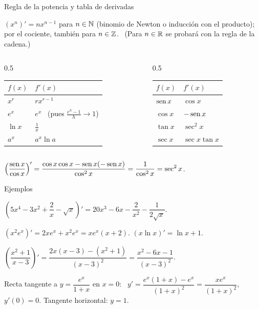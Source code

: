 \documentclass[10pt,aspectratio=169]{beamer}
\begin{document}
\begin{frame}{Regla de la potencia y tabla de derivadas}
  \begin{teorema}[potencia]
    $(x^n)'=nx^{n-1}$ para $n\in\mathbb{N}$ (binomio de Newton o inducción con el producto); por el cociente, también para $n\in\mathbb{Z}$.
    \ (Para $n\in\mathbb{R}$ se probará con la regla de la cadena.)
  \end{teorema}
  \begin{columns}[t]
    \begin{column}{0.5\textwidth}
      \renewcommand{\arraystretch}{1.5}
      \begin{tabular}{|l|l|}
        \hline
        $f(x)$ & $f'(x)$\\ \hline
        $x^r$ & $rx^{r-1}$\\
        $e^x$ & $e^x$ \ \small(pues $\frac{e^h-1}{h}\to1$)\\
        $\ln x$ & $\frac1x$\\
        $a^x$ & $a^x\ln a$\\ \hline
      \end{tabular}
    \end{column}
    \begin{column}{0.5\textwidth}
      \renewcommand{\arraystretch}{1.5}
      \begin{tabular}{|l|l|}
        \hline
        $f(x)$ & $f'(x)$\\ \hline
        $\operatorname{sen} x$ & $\cos x$\\
        $\cos x$ & $-\operatorname{sen} x$\\
        $\tan x$ & $\sec^2x$\\
        $\sec x$ & $\sec x\tan x$\\ \hline
      \end{tabular}
    \end{column}
  \end{columns}
  \vspace{2mm}
  \begin{ejemplo}
    $\displaystyle\left(\frac{\operatorname{sen} x}{\cos x}\right)'=\frac{\cos x\cos x-\operatorname{sen} x(-\operatorname{sen} x)}{\cos^2x}=\frac{1}{\cos^2x}=\sec^2x$.
  \end{ejemplo}
\end{frame}

\begin{frame}{Ejemplos}
  \begin{ejemplo}[1]
    $\left(5x^4-3x^2+\dfrac2x-\sqrt x\right)'=20x^3-6x-\dfrac{2}{x^2}-\dfrac{1}{2\sqrt x}$.
  \end{ejemplo}
  \begin{ejemplo}[2: producto]
    $(x^2e^x)'=2xe^x+x^2e^x=xe^x(x+2)$. \qquad $(x\ln x)'=\ln x+1$.
  \end{ejemplo}
  \begin{ejemplo}[3: cociente]
    $\left(\dfrac{x^2+1}{x-3}\right)'=\dfrac{2x(x-3)-(x^2+1)}{(x-3)^2}=\dfrac{x^2-6x-1}{(x-3)^2}$.
  \end{ejemplo}
  \begin{ejemplo}[4: tangente]
    Recta tangente a $y=\dfrac{e^x}{1+x}$ en $x=0$: \ $y'=\dfrac{e^x(1+x)-e^x}{(1+x)^2}=\dfrac{xe^x}{(1+x)^2}$, \ $y'(0)=0$.
    Tangente horizontal: $y=1$.
  \end{ejemplo}
\end{frame}
\end{document}
